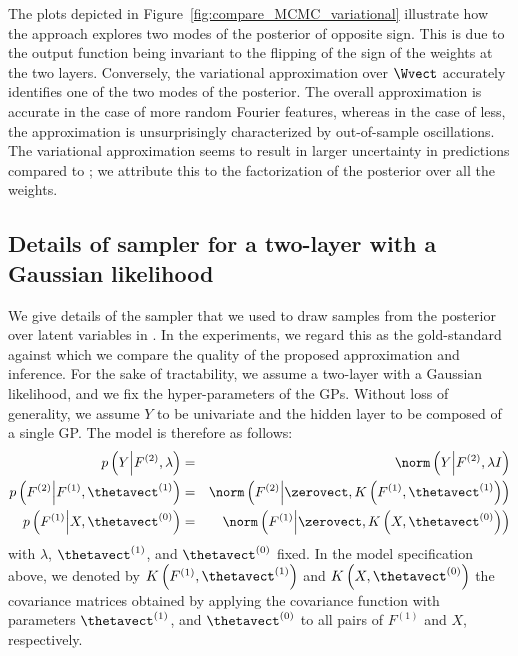 The plots depicted in Figure~\ref{fig:compare_MCMC_variational} illustrate how the \mcmc approach explores two modes of the posterior of opposite sign. 
This is due to the output function being invariant to the flipping of the sign of the weights at the two layers.
Conversely, the variational approximation over $\Wvect$ accurately identifies one of the two modes of the posterior.
The overall approximation is accurate in the case of more random Fourier features, whereas in the case of less, the approximation is unsurprisingly characterized by out-of-sample oscillations.
The variational approximation seems to result in larger uncertainty in predictions compared to \mcmc; we attribute this to the factorization of the posterior over all the weights.



\subsection{Details of \mcmc sampler for a two-layer \dgp with a Gaussian likelihood}

We give details of the \mcmc sampler that we used to draw samples from the posterior over latent variables in .
In the experiments, we regard this as the gold-standard against which we compare the quality of the proposed \dgp approximation and inference. 
For the sake of tractability, we assume a two-layer \dgp with a Gaussian likelihood, and we fix the hyper-parameters of the GPs.
Without loss of generality, we assume $Y$ to be univariate and the hidden layer to be composed of a single GP.
The model is therefore as follows:
\begin{eqnarray}
p\left(Y \middle| F^{(2)}, \lambda\right) & = & \norm\left( Y \middle| F^{(2)}, \lambda I \right) \nonumber \\
p\left(F^{(2)} \middle| F^{(1)}, \thetavect^{(1)}\right) & = & \norm\left( F^{(2)} \middle| \zerovect, K\left(F^{(1)}, \thetavect^{(1)}\right) \right)  \nonumber \\
p\left(F^{(1)} \middle| X, \thetavect^{(0)}\right) & = & \norm\left( F^{(1)} \middle| \zerovect, K\left(X, \thetavect^{(0)}\right) \right)  \nonumber 
\end{eqnarray}
with $\lambda$, $\thetavect^{(1)}$, and $\thetavect^{(0)}$ fixed.
In the model specification above, we denoted by $K\left(F^{(1)}, \thetavect^{(1)}\right)$ and $K\left(X, \thetavect^{(0)}\right)$ the covariance matrices obtained by applying the covariance function with parameters $\thetavect^{(1)}$, and $\thetavect^{(0)}$ to all pairs of $F^{(1)}$ and $X$, respectively.


